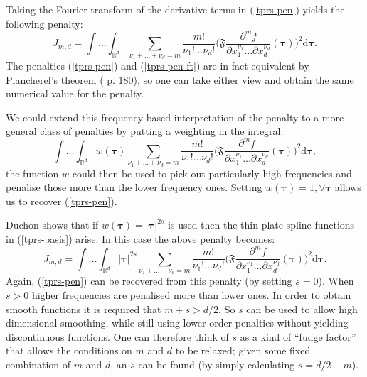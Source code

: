 Taking the Fourier transform of the derivative terms in (\ref{tprs-pen}) yields the following penalty:
\begin{equation}
J_{m,d} = \int \ldots \int_{\mathbb{R}^d} \sum_{\nu_1 + \dots + \nu_d=m} \frac{m!}{\nu_1! \dots \nu_d!}\Big( \mathfrak{F} \frac{\partial^m f}{\partial x_1^{\nu_1} \ldots  \partial x_d^{\nu_d}}(\boldsymbol{\tau}) \Big)^2 \text{d} \boldsymbol{\tau}.
\label{tprs-pen-ft}
\end{equation}
The penalties (\ref{tprs-pen}) and (\ref{tprs-pen-ft}) are in fact equivalent by Plancherel's theorem (\cite{vretblad} p. 180), so one can take either view and obtain the same numerical value for the penalty. 

We could extend this frequency-based interpretation of the penalty to a more general class of penalties by putting a weighting in the integral:
\begin{equation}
\int \ldots \int_{\mathbb{R}^d} w(\boldsymbol{\tau}) \sum_{\nu_1 + \dots + \nu_d=m} \frac{m!}{\nu_1! \dots \nu_d!}\Big( \mathfrak{F} \frac{\partial^m f}{\partial x_1^{\nu_1} \ldots  \partial x_d^{\nu_d}}(\boldsymbol{\tau}) \Big)^2 \text{d} \boldsymbol{\tau},
\label{duchon-penalty-general}
\end{equation}
the function $w$ could then be used to pick out particularly high frequencies and penalise those more than the lower frequency ones. Setting $w(\boldsymbol{\tau})=1, \forall \boldsymbol{\tau}$ allows us to recover (\ref{tprs-pen}).

Duchon shows that if $w(\boldsymbol{\tau})= \lvert \boldsymbol{\tau} \rvert^{2s}$ is used then the thin plate spline functions in (\ref{tprs-basis}) arise. In this case the above penalty becomes:
\begin{equation}
\breve{J}_{m,d} = \int \ldots \int_{\mathbb{R}^d} \lvert \boldsymbol{\tau} \rvert^{2s} \sum_{\nu_1 + \dots + \nu_d=m} \frac{m!}{\nu_1! \dots \nu_d!}\Big( \mathfrak{F} \frac{\partial^m f}{\partial x_1^{\nu_1} \ldots  \partial x_d^{\nu_d}}(\boldsymbol{\tau}) \Big)^2 \text{d} \boldsymbol{\tau}.
\label{duchon-penalty}
\end{equation}
Again, (\ref{tprs-pen}) can be recovered from this penalty (by setting $s=0$). When $s>0$ higher frequencies are penalised more than lower ones. In order to obtain smooth functions it is required that $m+s>d/2$. So $s$ can be used to allow high dimensional smoothing, while still using lower-order penalties without yielding discontinuous functions. One can therefore think of $s$ as a kind of ``fudge factor'' that allows the conditions on $m$ and $d$ to be relaxed; given some fixed combination of $m$ and $d$, an $s$ can be found (by simply calculating $s=d/2-m$).

